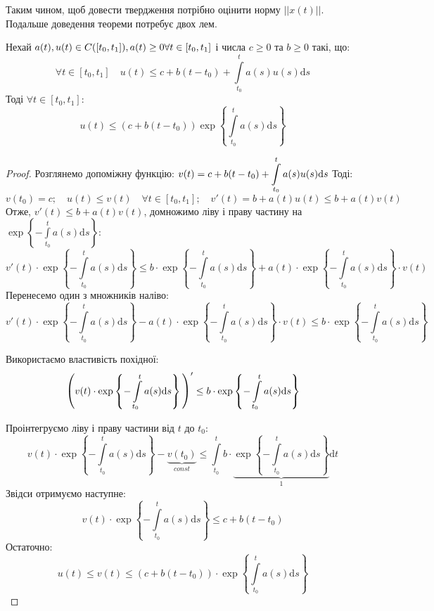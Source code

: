 \documentclass[14pt,a4paper]{scrartcl}
\theoremstyle{definition}
\theoremstyle{definition}
\theoremstyle{definition}
\begin{document}
Таким чином, щоб довести твердження потрібно оцінити норму $||x(t)||$. Подальше доведення теореми потребує двох лем.

\begin{boxlema}
Нехай $a(t), u(t) \in C([t_0, t_1]), a(t) \geq 0 \\ \forall t \in [t_0, t_1]$ і числа $c \geq 0$ та $b \geq 0$ такі, що: $$\forall t \in [t_0, t_1] \quad u(t) \leq c + b(t - t_0) + \int\limits_{t_0}^{t}a(s)u(s)\mathrm{d}s$$
Тоді $\forall t \in [t_0, t_1]:$ $$ u(t) \leq (c + b(t-t_0))\exp \left\lbrace {\int\limits_{t_0}^{t} a(s)\mathrm{d}s} \right\rbrace$$
\end{boxlema}

\begin{proof}
Розглянемо допоміжну функцію: $v(t) = c  +  b(t-t_0) + \mathop{\mathlarger{\int}}\limits_{t_0}^{t}a(s)u(s)\mathrm{d}s$ Тоді: $$ v(t_0) = c; \quad u(t) \leq v(t) \quad \forall t \in [t_0, t_1]; \quad v'(t) = b + a(t)u(t) \leq b + a(t)v(t)$$ Отже, $v'(t) \leq b + a(t)v(t)$, домножимо ліву і праву частину на $\exp \left\lbrace {-\int\limits_{t_0}^{t} a(s)\mathrm{d}s} \right\rbrace$: $$v'(t) \cdot
\exp \left\lbrace {-\int\limits_{t_0}^{t} a(s)\mathrm{d}s} \right\rbrace \leq b \cdot \exp \left\lbrace {-\int\limits_{t_0}^{t} a(s)\mathrm{d}s} \right\rbrace + a(t) \cdot \exp \left\lbrace {-\int\limits_{t_0}^{t} a(s)\mathrm{d}s} \right\rbrace \cdot v(t) $$
Перенесемо один з множників наліво: $$v'(t) \cdot \exp \left\lbrace {-\int\limits_{t_0}^{t} a(s)\mathrm{d}s} \right\rbrace - a(t) \cdot \exp \left\lbrace {-\int\limits_{t_0}^{t} a(s)\mathrm{d}s} \right\rbrace \cdot v(t)\leq b \cdot \exp \left\lbrace {-\int\limits_{t_0}^{t} a(s)\mathrm{d}s} \right\rbrace $$

Використаємо властивість похідної: $$\mathlarger{\Bigg(}v(t) \cdot \exp \left\lbrace {-\int\limits_{t_0}^{t} a(s)\mathrm{d}s} \right\rbrace \mathlarger{\Bigg)}' \leq b \cdot \exp \left\lbrace {-\int\limits_{t_0}^{t} a(s)\mathrm{d}s} \right\rbrace $$

Проінтегруємо ліву і праву частини від $t$ до $t_0$:
$$ v(t) \cdot \exp \left\lbrace {-\int\limits_{t_0}^{t} a(s)\mathrm{d}s} \right\rbrace - \underbrace{v(t_0)}_{const} \leq \int\limits_{t_0}^{t}b \cdot \underbrace{\exp \left\lbrace {-\int\limits_{t_0}^{t} a(s)\mathrm{d}s} \right\rbrace }_{1}\mathrm{d}t$$
Звідси отримуємо наступне: $$ v(t) \cdot \exp \left\lbrace {-\int\limits_{t_0}^{t} a(s)\mathrm{d}s} \right\rbrace  \leq c + b(t - t_0) $$
Остаточно: $$ u(t) \leq v(t) \leq (c + b(t - t_0)) \cdot \exp \left\lbrace {\int\limits_{t_0}^{t} a(s)\mathrm{d}s}  \right\rbrace $$
\end{proof}
\end{document}
